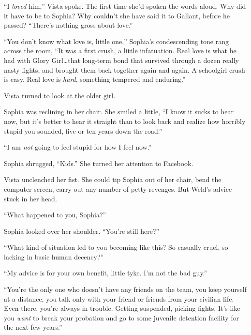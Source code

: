 ``I \emph{loved} him,'' Vista spoke.  The first time she'd spoken the words aloud.  Why did it have to be to Sophia?  Why couldn't she have said it to Gallant, before he passed?  ``There's nothing gross about love.''



``You don't know what love is, little one,'' Sophia's condescending tone rang across the room, ``It was a first crush, a little infatuation.  Real love is what he had with Glory Girl\ldots that long-term bond that survived through a dozen really nasty fights, and brought them back together again and again.  A schoolgirl crush is easy.  Real love is \emph{hard}, something tempered and enduring.''



Vista turned to look at the older girl.



Sophia was reclining in her chair.  She smiled a little, ``I know it sucks to hear now, but it's better to hear it straight than to look back and realize how horribly stupid you sounded, five or ten years down the road.''



``I am \emph{not} going to feel stupid for how I feel now.''



Sophia shrugged, ``Kids.''  She turned her attention to Facebook.



Vista unclenched her fist.  She could tip Sophia out of her chair, bend the computer screen, carry out any number of petty revenges.  But Weld's advice stuck in her head.



``What happened to you, Sophia?''



Sophia looked over her shoulder.  ``You're still here?''



``What kind of situation led to you becoming like this?  So casually cruel, so lacking in basic human decency?''



``My advice is for your own benefit, little tyke.  I'm not the bad guy.''



``You're the only one who doesn't have any friends on the team, you keep yourself at a distance, you talk only with your friend or friends from your civilian life.  Even there, you're always in trouble.  Getting suspended, picking fights.  It's like you \emph{want} to break your probation and go to some juvenile detention facility for the next few years.''




